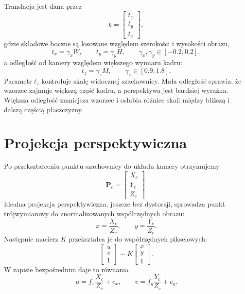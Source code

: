 \documentclass[12pt,a4paper]{report}
\begin{document}
Translacja jest dana przez
\begin{equation}
    \mathbf{t} =
    \begin{bmatrix}
        t_x \\
        t_y \\
        t_z
    \end{bmatrix},
\end{equation}
gdzie składowe boczne są losowane względem szerokości i wysokości obrazu,
\begin{equation}
    t_x = \gamma_x W,
    \qquad
    t_y = \gamma_y H,
    \qquad
    \gamma_x,\gamma_y \in [-0.2,0.2],
\end{equation}
a odległość od kamery względem większego wymiaru kadru:
\begin{equation}
    t_z = \gamma_z M,
    \qquad
    \gamma_z \in [0.9,1.8].
\end{equation}
Parametr $t_z$ kontroluje skalę widocznej szachownicy. Mała odległość sprawia, że wzorzec
zajmuje większą część kadru, a perspektywa jest bardziej wyraźna. Większa odległość zmniejsza
wzorzec i osłabia różnice skali między bliższą i dalszą częścią płaszczyzny.

\section{Projekcja perspektywiczna}
Po przekształceniu punktu szachownicy do układu kamery otrzymujemy
\begin{equation}
    \mathbf{P}_c =
    \begin{bmatrix}
        X_c \\
        Y_c \\
        Z_c
    \end{bmatrix}.
\end{equation}
Idealna projekcja perspektywiczna, jeszcze bez dystorsji, sprowadza punkt trójwymiarowy
do znormalizowanych współrzędnych obrazu:
\begin{equation}
    x = \frac{X_c}{Z_c},
    \qquad
    y = \frac{Y_c}{Z_c}.
\end{equation}
Następnie macierz $K$ przekształca je do współrzędnych pikselowych:
\begin{equation}
    \begin{bmatrix}
        u \\
        v \\
        1
    \end{bmatrix}
    \sim
    K
    \begin{bmatrix}
        x \\
        y \\
        1
    \end{bmatrix}.
\end{equation}
W zapisie bezpośrednim daje to równania
\begin{equation}
    u = f_x\frac{X_c}{Z_c} + c_x,
    \qquad
    v = f_y\frac{Y_c}{Z_c} + c_y.
\end{equation}
\end{document}
